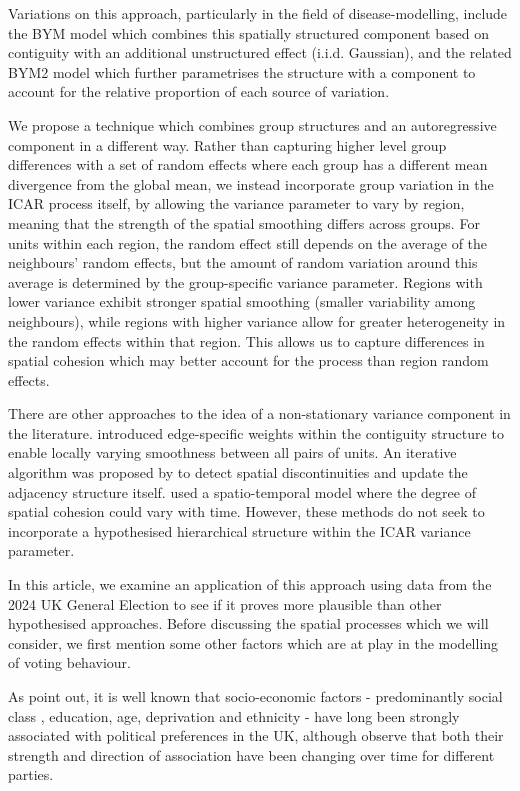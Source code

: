 \documentclass[webpdf,large,contemporary,namedate]{oup-authoring-template}
\theoremstyle{thmstyleone}
\theoremstyle{thmstyletwo}
\theoremstyle{thmstylethree}
\begin{document}
Variations on this approach, particularly in the field of
disease-modelling, include the BYM model \citep{besag1991} which
combines this spatially structured component based on contiguity with an
additional unstructured effect (i.i.d. Gaussian), and the related BYM2
model \citep{Riebler2016} which further parametrises the structure with
a component to account for the relative proportion of each source of
variation.

We propose a technique which combines group structures and an
autoregressive component in a different way. Rather than capturing
higher level group differences with a set of random effects where each
group has a different mean divergence from the global mean, we instead
incorporate group variation in the ICAR process itself, by allowing the
variance parameter to vary by region, meaning that the strength of the
spatial smoothing differs across groups. For units within each region,
the random effect still depends on the average of the neighbours' random
effects, but the amount of random variation around this average is
determined by the group-specific variance parameter. Regions with lower
variance exhibit stronger spatial smoothing (smaller variability among
neighbours), while regions with higher variance allow for greater
heterogeneity in the random effects within that region. This allows us
to capture differences in spatial cohesion which may better account for
the process than region random effects.

There are other approaches to the idea of a non-stationary variance
component in the literature. \citet{Brewer2007} introduced edge-specific
weights within the contiguity structure to enable locally varying
smoothness between all pairs of units. An iterative algorithm was
proposed by \citet{DuncanLee2014} to detect spatial discontinuities and
update the adjacency structure itself. \citet{Jack2019} used a
spatio-temporal model where the degree of spatial cohesion could vary
with time. However, these methods do not seek to incorporate a
hypothesised hierarchical structure within the ICAR variance parameter.

In this article, we examine an application of this approach using data
from the 2024 UK General Election to see if it proves more plausible
than other hypothesised approaches. Before discussing the spatial
processes which we will consider, we first mention some other factors
which are at play in the modelling of voting behaviour.

As \citet{griffiths2024brexit} point out, it is well known that
socio-economic factors - predominantly social class \citep{Butler1974},
education, age, deprivation and ethnicity - have long been strongly
associated with political preferences in the UK, although
\citet{Jennings2024} observe that both their strength and direction of
association have been changing over time for different parties.
\end{document}
